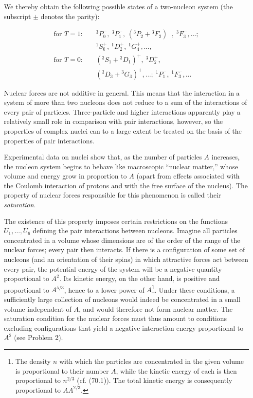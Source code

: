 We thereby obtain the following possible states of a two-nucleon system (the
subscript $\pm$ denotes the parity):

\begin{align*}
 \text{for }T=1:&\quad {}^3P_0^-,\ {}^3P_1^-,\
 ({}^3P_2+{}^3F_2)^-,\ {}^3F_3^-,\ldots;\\
 &\quad {}^1S_0^+,\ {}^1D_2^+,\ {}^1G_4^+,\ldots,\\
 \text{for }T=0:&\quad ({}^3S_1+{}^3D_1)^+,\ {}^3D_2^+,\\
 &\quad ({}^3D_3+{}^3G_3)^+,\ldots;\
 {}^1P_1^-,\ {}^1F_3^-,\ldots
\end{align*}

Nuclear forces are not additive in general. This means that the interaction
in a system of more than two nucleons does not reduce to a sum of the
interactions of every pair of particles. Three-particle and higher
interactions apparently play a relatively small role in comparison with pair
interactions, however, so the properties of complex nuclei can to a large
extent be treated on the basis of the properties of pair interactions.

Experimental data on nuclei show that, as the number of particles $A$
increases, the nucleon system begins to behave like macroscopic ``nuclear
matter,'' whose volume and energy grow in proportion to $A$ (apart from
effects associated with the Coulomb interaction of protons and with the free
surface of the nucleus). The property of nuclear forces responsible for this
phenomenon is called their \emph{saturation}.

The existence of this property imposes certain restrictions on the functions
$U_1,\ldots,U_6$ defining the pair interactions between nucleons. Imagine all
particles concentrated in a volume whose dimensions are of the order of the
range of the nuclear forces; every pair then interacts. If there is a
configuration of some set of nucleons (and an orientation of their spins) in
which attractive forces act between every pair, the potential energy of the
system will be a negative quantity proportional to $A^2$. Its kinetic energy,
on the other hand, is positive and proportional to $A^{5/3}$, hence to a lower
power of $A$\footnote{The density $n$ with which the particles are
concentrated in the given volume is proportional to their number $A$, while
the kinetic energy of each is then proportional to $n^{2/3}$ (cf. (70.1)).
The total kinetic energy is consequently proportional to $AA^{2/3}$.}. Under
these conditions, a sufficiently large collection of nucleons would indeed
be concentrated in a small volume independent of $A$, and would therefore not
form nuclear matter. The saturation condition for the nuclear forces must
thus amount to conditions excluding configurations that yield a negative
interaction energy proportional to $A^2$ (see Problem 2).

